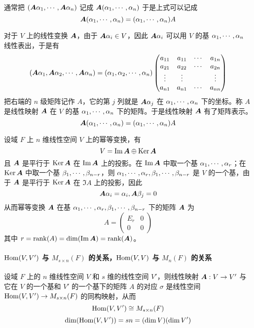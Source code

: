 通常把 $(\boldsymbol{A} \alpha_1,\cdots,\boldsymbol{A} \alpha_n)$ 记成 $\boldsymbol{A}(\alpha_1,\cdots,\alpha_n)$ 于是上式可以记成
\[ \boldsymbol{A}(\alpha_1,\cdots,\alpha_n) = (\alpha_1,\cdots,\alpha_n) A\]

对于 $V$ 上的线性变换 $\boldsymbol{A}$，由于 $\boldsymbol{A} \alpha_i \in V$，因此 $\boldsymbol{A} \alpha_i$ 可以用 $V$ 的基 $\alpha_1,\cdots,\alpha_n$ 线性表出，于是有
\[ 
    \left( \boldsymbol{A} \alpha_1 , \boldsymbol{A} \alpha_2 , \cdots , \boldsymbol{A} \alpha_n \right) = 
    \left( \alpha_1 , \alpha_2 , \cdots , \alpha_n \right)
    \left( \begin{matrix}
        a_{11} & a_{11} & \cdots & a_{1n}\\
        a_{21} & a_{22} & \cdots & a_{2n}\\
        \vdots & \vdots &        & \vdots\\
        a_{n1} & a_{n1} & \cdots & a_{nn}
    \end{matrix} \right)
\]
把右端的 $n$ 级矩阵记作 $A$，它的第 $j$ 列就是 $\boldsymbol{A} \alpha_j$ 在 $\alpha_1,\cdots,\alpha_n$ 下的坐标。称 $A$ 是线性映射 $\boldsymbol{A}$ 在 $V$ 的基 $\alpha_1,\cdots,\alpha_n$ 下的矩阵。于是线性映射 $\boldsymbol{A}$ 有了矩阵表示。
\[ \boldsymbol{A}(\alpha_1,\cdots,\alpha_n) = (\alpha_1,\cdots,\alpha_n) A\]

设域 $F$ 上 $n$ 维线性空间 $V$ 上的幂等变换，有
\[ V = \operatorname{Im} \boldsymbol{A} \oplus \operatorname{Ker} \boldsymbol{A} \]
且 $\boldsymbol{A}$ 是平行于 $\operatorname{Ker} \boldsymbol{A}$ 在 $\operatorname{Im} \boldsymbol{A}$ 上的投影。在 $\operatorname{Im} \boldsymbol{A}$ 中取一个基 $\alpha_1,\cdots,\alpha_r$；在 $\operatorname{Ker} \boldsymbol{A}$ 中取一个基 $\beta_1,\cdots,\beta_{n-r}$，则 $\alpha_1,\cdots,\alpha_r,\beta_1,\cdots,\beta_{n-r}$ 是 $V$ 的一个基，由于 $\boldsymbol{A}$ 是平行于 $\operatorname{Ker} \boldsymbol{A}$ 在 $\Im A$ 上的投影，因此
\[ \boldsymbol{A} \alpha_i = \alpha_i, \boldsymbol{A} \beta_j = 0 \]
从而幂等变换 $\boldsymbol{A}$ 在基 $\alpha_1,\cdots,\alpha_r,\beta_1,\cdots,\beta_{n-r}$ 下的矩阵 $\boldsymbol{A}$ 为
\[ A = \left(\begin{matrix}
    E_r & 0\\
    0   & 0
\end{matrix}\right) \]
其中 $r = \operatorname{rank}(A) = \dim(\operatorname{Im} \boldsymbol{A}) = \operatorname{rank}(\boldsymbol{A})$。

\paragraph{$\operatorname{Hom}(V,V')$ 与 $M_{s \times n}(F)$ 的关系，$\operatorname{Hom}(V,V)$ 与 $M_n(F)$ 的关系}

\begin{theorem}
    设域 $F$ 上的 $n$ 维线性空间 $V$ 和 $s$ 维的线性空间 $V'$，则线性映射 $\boldsymbol{A} : V \to V'$ 与它在 $V$ 的一个基和 $V'$ 的一个基下的矩阵 $A$ 的对应 $\sigma$ 是线性空间 $\operatorname{Hom}(V,V') \to M_{s \times n}(F)$ 的同构映射，从而
    \[ \operatorname{Hom}(V,V') \cong M_{s \times n}(F) \]
    \[ \dim(\operatorname{Hom}(V,V')) = sn = (\dim V)(\dim V') \]
\end{theorem}

